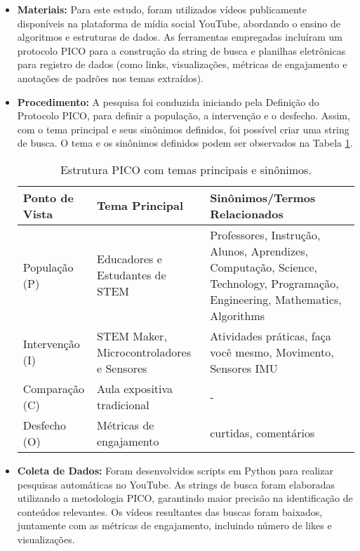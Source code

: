 \documentclass[manuscript,screen,review]{acmart}
\begin{document}
\begin{itemize}
    \item \textbf{Materiais:} 
    Para este estudo, foram utilizados vídeos publicamente disponíveis na plataforma de mídia social YouTube, abordando o ensino de algoritmos e estruturas de dados. As ferramentas empregadas incluíram um protocolo PICO para a construção da string de busca e planilhas eletrônicas para registro de dados (como links, visualizações, métricas de engajamento e anotações de padrões nos temas extraídos).

    \item \textbf{Procedimento:} 
    A pesquisa foi conduzida iniciando pela Definição do Protocolo PICO, para definir a população, a intervenção e o desfecho. Assim, com o tema principal e seus sinônimos definidos, foi possível criar uma string de busca. O tema e os sinônimos definidos podem ser observados na Tabela \ref{tab:PICO}. 

    \begin{table}[ht]
    \centering
    \begin{tabular}{|p{3cm}|p{4cm}|p{7cm}|}
    \hline
    \textbf{Ponto de Vista} & \textbf{Tema Principal} & \textbf{Sinônimos/Termos Relacionados} \\ \hline
    População (P)           & Educadores e Estudantes de STEM &  Professores, Instrução,  Alunos, Aprendizes, Computação, Science, Technology, Programação, Engineering, Mathematics, Algorithms \\ \hline
    Intervenção (I)         & STEM Maker, Microcontroladores e Sensores & Atividades práticas, faça você mesmo, Movimento, Sensores IMU\\ \hline
    Comparação (C)          & Aula expositiva tradicional & - \\ \hline
    Desfecho (O)            & Métricas de engajamento & curtidas, comentários \\ \hline
    \end{tabular}
    \caption{Estrutura PICO com temas principais e sinônimos.}
    \label{tab:PICO}
    \end{table}

    \item \textbf{Coleta de Dados:} 
    Foram desenvolvidos scripts em Python para realizar pesquisas automáticas no YouTube. As strings de busca foram elaboradas utilizando a metodologia PICO, garantindo maior precisão na identificação de conteúdos relevantes. Os vídeos resultantes das buscas foram baixados, juntamente com as métricas de engajamento, incluindo número de likes e visualizações.


\end{itemize}
\end{document}
